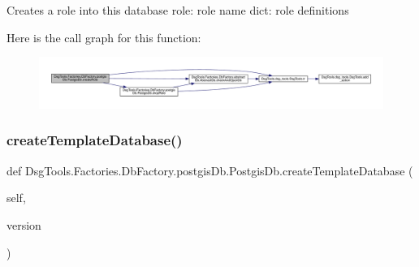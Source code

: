 \begin{DoxyVerb}Creates a role into this database
role: role name
dict: role definitions
\end{DoxyVerb}
 Here is the call graph for this function\+:
\nopagebreak
\begin{figure}[H]
\begin{center}
\leavevmode
\includegraphics[width=350pt]{class_dsg_tools_1_1_factories_1_1_db_factory_1_1postgis_db_1_1_postgis_db_ace547927f57afe2b2aaf26b122fea42c_cgraph}
\end{center}
\end{figure}
\mbox{\label{class_dsg_tools_1_1_factories_1_1_db_factory_1_1postgis_db_1_1_postgis_db_ac9366aea071d6c0baa3c02094a2b69a6}} 
\subsubsection{\texorpdfstring{create\+Template\+Database()}{createTemplateDatabase()}}
{\footnotesize\ttfamily def Dsg\+Tools.\+Factories.\+Db\+Factory.\+postgis\+Db.\+Postgis\+Db.\+create\+Template\+Database (\begin{DoxyParamCaption}\item[{}]{self,  }\item[{}]{version }\end{DoxyParamCaption})}

